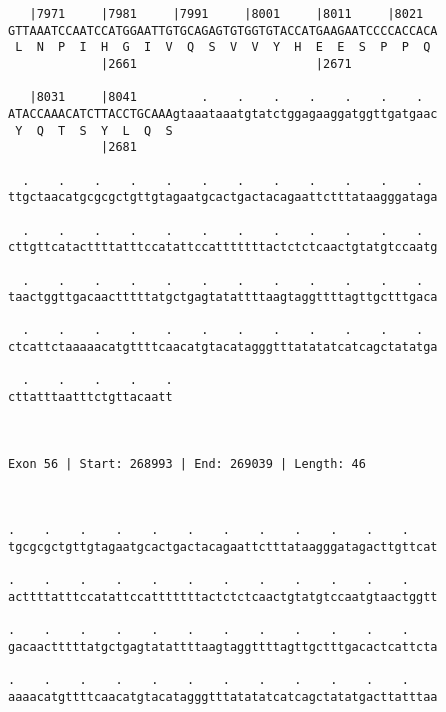 \documentclass{article}
\begin{document}
\begin{Verbatim}
   |7971     |7981     |7991     |8001     |8011     |8021  
GTTAAATCCAATCCATGGAATTGTGCAGAGTGTGGTGTACCATGAAGAATCCCCACCACA
 L  N  P  I  H  G  I  V  Q  S  V  V  Y  H  E  E  S  P  P  Q 
             |2661                         |2671            
  
   |8031     |8041         .    .    .    .    .    .    .  
ATACCAAACATCTTACCTGCAAAgtaaataaatgtatctggagaaggatggttgatgaac
 Y  Q  T  S  Y  L  Q  S                                     
             |2681                                          
  
  .    .    .    .    .    .    .    .    .    .    .    .  
ttgctaacatgcgcgctgttgtagaatgcactgactacagaattctttataagggataga
                                                            
  .    .    .    .    .    .    .    .    .    .    .    .  
cttgttcatacttttatttccatattccatttttttactctctcaactgtatgtccaatg
                                                            
  .    .    .    .    .    .    .    .    .    .    .    .  
taactggttgacaactttttatgctgagtatattttaagtaggttttagttgctttgaca
                                                            
  .    .    .    .    .    .    .    .    .    .    .    .  
ctcattctaaaaacatgttttcaacatgtacatagggtttatatatcatcagctatatga
                                                            
  .    .    .    .    .
cttatttaatttctgttacaatt
                       
                       
 
Exon 56 | Start: 268993 | End: 269039 | Length: 46



.    .    .    .    .    .    .    .    .    .    .    .    
tgcgcgctgttgtagaatgcactgactacagaattctttataagggatagacttgttcat
                                                            
.    .    .    .    .    .    .    .    .    .    .    .    
acttttatttccatattccatttttttactctctcaactgtatgtccaatgtaactggtt
                                                            
.    .    .    .    .    .    .    .    .    .    .    .    
gacaactttttatgctgagtatattttaagtaggttttagttgctttgacactcattcta
                                                            
.    .    .    .    .    .    .    .    .    .    .    .    
aaaacatgttttcaacatgtacatagggtttatatatcatcagctatatgacttatttaa
                                                            

\end{Verbatim}
\end{document}
